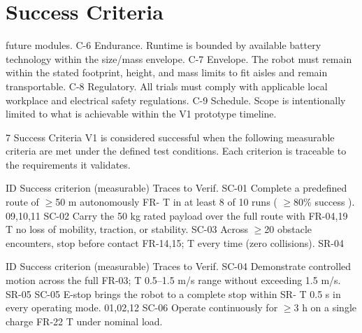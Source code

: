 \chapter{Success Criteria}

future modules. C-6 Endurance. Runtime is bounded by available battery technology within the size/mass envelope. C-7 Envelope. The robot must remain within the stated footprint, height, and mass limits to fit aisles and remain transportable. C-8 Regulatory. All trials must comply with applicable local workplace and electrical safety regulations. C-9 Schedule. Scope is intentionally limited to what is achievable within the V1 prototype timeline.

7 Success Criteria V1 is considered successful when the following measurable criteria are met under the defined test conditions. Each criterion is traceable to the requirements it validates.

ID         Success criterion (measurable)                            Traces to        Verif. SC-01      Complete a predefined route of $\geq$50 m autonomously         FR-                 T in at least 8 of 10 runs ( $\geq$80\% success ).                09,10,11 SC-02      Carry the 50 kg rated payload over the full route with    FR-04,19            T no loss of mobility, traction, or stability. SC-03      Across $\geq$20 obstacle encounters, stop before contact       FR-14,15;           T every time (zero collisions).                             SR-04

ID         Success criterion (measurable)                          Traces to        Verif. SC-04      Demonstrate controlled motion across the full           FR-03;              T 0.5--1.5 m/s range without exceeding 1.5 m/s.            SR-05 SC-05      E-stop brings the robot to a complete stop within       SR-                 T 0.5 s in every operating mode.                          01,02,12 SC-06      Operate continuously for $\geq$3 h on a single charge        FR-22               T under nominal load.

